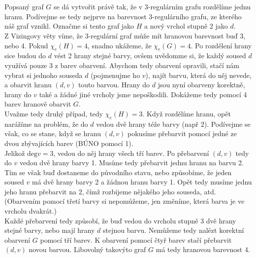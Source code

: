 \documentclass{scrartcl}
\begin{document}
    \section{}
    Popsaný graf $G$ se dá vytvořit právě tak, že v 3-regulárním grafu rozdělíme jednu hranu. Podívejme se tedy nejprve na barevnost 3-regulárního grafu, ze kterého náš graf vznikl. Označme si tento graf jako $H$ a nový vrchol stupně 2 jako $d$. \\

    Z Vizingovy věty víme, že 3-regulární graf může mít hranovou barevnost buď 3, nebo 4. Pokud $\chi_e (H) = 4$, snadno ukážeme, že $\chi_e (G) = 4$. Po rozdělení hrany sice budou do $d$ vést 2 hrany stejné barvy, ovšem uvědomme si, že každý soused $d$ využívá pouze 3 z barev obarvení. Abychom tedy obarvení opravili, stačí nám vybrat si jednoho souseda $d$ (pojmenujme ho $v$), najít barvu, která do něj nevede, a obarvit hranu $(d,v)$ touto barvou. Hrany do $d$ jsou nyní obarveny korektně, hrany do $v$ také a žádné jiné vrcholy jsme nepoškodili. Dokážeme tedy pomocí 4 barev hranově obarvit $G$. \\

    Uvažme tedy druhý případ, tedy $\chi_e (H) = 3$. Když rozdělíme hranu, opět narážíme na problém, že do $d$ vedou dvě hrany téže barvy (např 2). Podívejme se však, co se stane, když se hranu $(d,v)$ pokusíme přebarvit pomocí jedné ze dvou zbývajících barev (BÚNO pomocí 1). \\

    Jelikož $\text{deg} v = 3$, vedou do něj hrany všech tří barev. Po přebarvení $(d,v)$ tedy do $v$ vedou dvě hrany barvy 1. Musíme tedy přebarvit jednu hranu na barvu 2. Tím se však buď dostaneme do původního stavu, nebo způsobíme, že jeden soused $v$ má dvě hrany barvy 2 a žádnou hranu barvy 1. Opět tedy musíme jednu jeho hranu přebarvit na 2, čímž rozbijeme nějakého jeho souseda, atd. (Obarvením pomocí třetí barvy si nepomůžeme, jen změníme, která barva je ve vrcholu dvakrát.) \\

    Každé přebarvení tedy způsobí, že buď vedou do vrcholu stupně 3 dvě hrany stejné barvy, nebo mají hrany $d$ stejnou barvu. Nemůžeme tedy nalézt korektní obarvení $G$ pomocí tří barev. K obarvení pomocí čtyř barev stačí přebarvit $(d,v)$ novou barvou. Libovolný takovýto graf $G$ má tedy hranovou barevnost 4.

    \section{}
\end{document}

